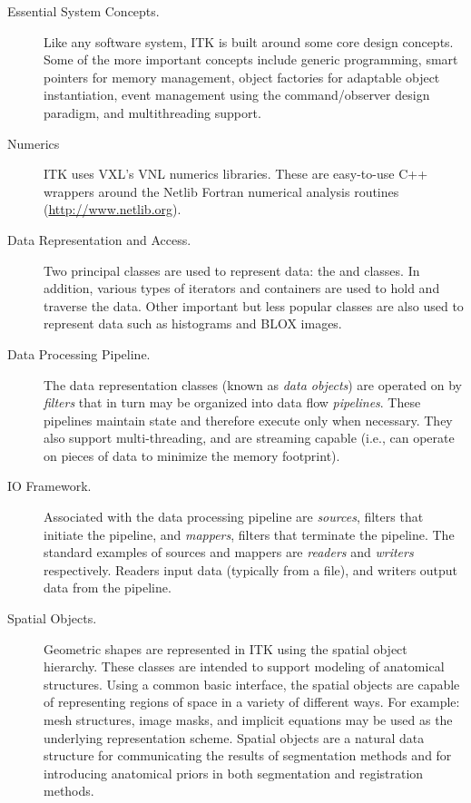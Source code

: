 \begin{description}
	\item[Essential System Concepts.] Like any software system, ITK is
        built around some core design concepts. Some of the more important
        concepts include generic programming, smart pointers for memory
        management, object factories for adaptable object instantiation,
        event management using the command/observer design paradigm, and
        multithreading support.

	\item[Numerics] ITK uses VXL's VNL numerics libraries. These are
        easy-to-use C++ wrappers around the Netlib Fortran numerical 
        analysis routines (\url{http://www.netlib.org}).

	\item[Data Representation and Access.]  Two principal classes are
        used to represent data: the  and 
        classes.  In addition, various types of iterators and containers are
        used to hold and traverse the data. Other important but less popular
        classes are also used to represent data such as histograms and BLOX
        images.

	\item[Data Processing Pipeline.]  The data representation
	classes (known as \emph{data objects}) are operated on by
	\emph{filters} that in turn may be organized into data flow
	\emph{pipelines}. These pipelines maintain state and therefore
	execute only when necessary.  They also support
	multi-threading, and are streaming capable (i.e., can operate
	on pieces of data to minimize the memory footprint).

        \item[IO Framework.] Associated with the data processing
        pipeline are \emph{sources}, filters that initiate the
        pipeline, and \emph{mappers}, filters that terminate the
        pipeline.  The standard examples of sources and mappers are
        \emph{readers} and \emph{writers} respectively.  Readers
        input data (typically from a file), and writers output data
        from the pipeline.

	\item[Spatial Objects.] Geometric shapes are represented in ITK using
        the spatial object hierarchy.  These classes are intended to support
        modeling of anatomical structures. Using a common basic interface,
        the spatial objects are capable of representing regions of space in a
        variety of different ways. For example: mesh structures, image masks,
        and implicit equations may be used as the underlying representation
        scheme.  Spatial objects are a natural data structure for
        communicating the results of segmentation methods and for introducing
        anatomical priors in both segmentation and registration methods.


\end{description}
